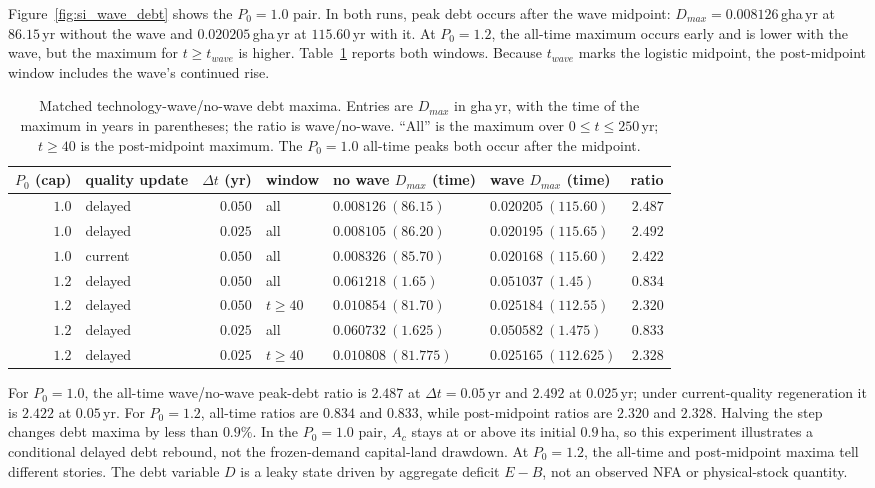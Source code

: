 \documentclass[11pt,a4paper]{article}
\begin{document}
Figure~\ref{fig:si_wave_debt} shows the $P_0=1.0$ pair. In both runs, peak debt occurs after the wave midpoint: $D_{max}=0.008126$\,gha\,yr at $86.15$\,yr without the wave and $0.020205$\,gha\,yr at $115.60$\,yr with it. At $P_0=1.2$, the all-time maximum occurs early and is lower with the wave, but the maximum for $t\ge t_{wave}$ is higher. Table~\ref{tab:si_wave_debt} reports both windows. Because $t_{wave}$ marks the logistic midpoint, the post-midpoint window includes the wave's continued rise.

\begin{table}[htbp]
\centering\small
\caption{Matched technology-wave/no-wave debt maxima. Entries are $D_{max}$ in gha\,yr, with the time of the maximum in years in parentheses; the ratio is wave/no-wave. ``All'' is the maximum over $0\le t\le250$\,yr; $t\ge40$ is the post-midpoint maximum. The $P_0=1.0$ all-time peaks both occur after the midpoint.}
\label{tab:si_wave_debt}
\begin{tabularx}{\textwidth}{r l r l >{\centering\arraybackslash}X >{\centering\arraybackslash}X r}
\toprule
$P_0$ (cap) & quality update & $\Delta t$ (yr) & window & no wave $D_{max}$ (time) & wave $D_{max}$ (time) & ratio \\
\midrule
$1.0$ & delayed & $0.050$ & all & $0.008126\ (86.15)$ & $0.020205\ (115.60)$ & $2.487$ \\
$1.0$ & delayed & $0.025$ & all & $0.008105\ (86.20)$ & $0.020195\ (115.65)$ & $2.492$ \\
$1.0$ & current & $0.050$ & all & $0.008326\ (85.70)$ & $0.020168\ (115.60)$ & $2.422$ \\
$1.2$ & delayed & $0.050$ & all & $0.061218\ (1.65)$ & $0.051037\ (1.45)$ & $0.834$ \\
$1.2$ & delayed & $0.050$ & $t\ge40$ & $0.010854\ (81.70)$ & $0.025184\ (112.55)$ & $2.320$ \\
$1.2$ & delayed & $0.025$ & all & $0.060732\ (1.625)$ & $0.050582\ (1.475)$ & $0.833$ \\
$1.2$ & delayed & $0.025$ & $t\ge40$ & $0.010808\ (81.775)$ & $0.025165\ (112.625)$ & $2.328$ \\
\bottomrule
\end{tabularx}
\end{table}

For $P_0=1.0$, the all-time wave/no-wave peak-debt ratio is $2.487$ at $\Delta t=0.05$\,yr and $2.492$ at $0.025$\,yr; under current-quality regeneration it is $2.422$ at $0.05$\,yr. For $P_0=1.2$, all-time ratios are $0.834$ and $0.833$, while post-midpoint ratios are $2.320$ and $2.328$. Halving the step changes debt maxima by less than $0.9\%$. In the $P_0=1.0$ pair, $A_c$ stays at or above its initial $0.9$\,ha, so this experiment illustrates a conditional delayed debt rebound, not the frozen-demand capital-land drawdown. At $P_0=1.2$, the all-time and post-midpoint maxima tell different stories. The debt variable $D$ is a leaky state driven by aggregate deficit $E-B$, not an observed NFA or physical-stock quantity.
\end{document}
